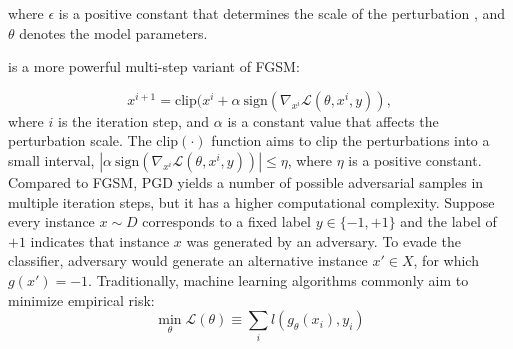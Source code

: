where $\epsilon$ is a positive constant that determines the scale of the perturbation , and $\theta$ denotes the model parameters.



 is a more powerful multi-step variant of FGSM:

\begin{equation} \label{eq:PGD}
x^{i+1} = \mbox{clip}(x^i + \alpha\ \mbox{sign}(\nabla_{x^i}\mathcal{L}(\theta,x^i,y)),
\end{equation}
where $i$ is the iteration step, and $\alpha$ is a constant value that affects the perturbation scale. The $\mbox{clip}(\cdot)$ function aims to clip the perturbations into a small interval, \ie $|\alpha\ \mbox{sign}(\nabla_{x^i}\mathcal{L}(\theta,x^i,y))|\leq \eta$, where $\eta$ is a positive constant. Compared to FGSM, PGD yields a number of possible adversarial samples in multiple iteration steps, but it has a higher computational complexity\cite{liu2022threats}.
Suppose every instance $x \sim D$ corresponds to a fixed label $y \in \{-1, +1\}$ and the label of $+1$ indicates that instance $x$ was generated by an adversary. To evade the classifier, adversary would generate an alternative instance $x' \in X$, for which $g(x') = -1$. 
Traditionally, machine learning algorithms commonly aim to minimize  empirical
risk:
\begin{equation}
\label{E:standardloss2}
\min_\theta \mathcal{L}(\theta) \equiv \sum_i l(g_\theta(x_i),y_i) 
\end{equation}


